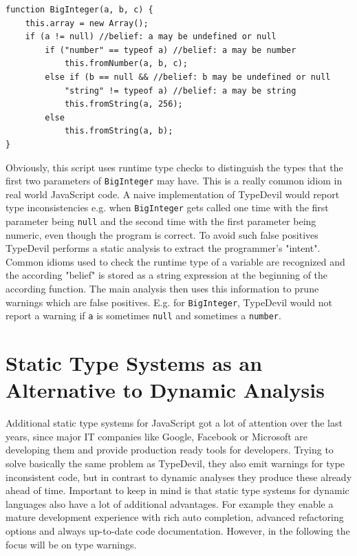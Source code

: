 \documentclass[runningheads,a4paper]{llncs}
\begin{document}
\medskip\medskip
\lstset{language=javascript}
\begin{minipage}{\linewidth}
\begin{lstlisting}[frame=single, caption=Pruning via Belief Analysis, label={lst:BeliefAnalysis}]
function BigInteger(a, b, c) { 
    this.array = new Array();
    if (a != null) //belief: a may be undefined or null
        if ("number" == typeof a) //belief: a may be number
            this.fromNumber(a, b, c);
        else if (b == null && //belief: b may be undefined or null
            "string" != typeof a) //belief: a may be string
            this.fromString(a, 256); 
        else  
            this.fromString(a, b);
}
\end{lstlisting}
\end{minipage}
Obviously, this script uses runtime type checks to distinguish the types that the first two parameters of \lstinline[columns=fixed]{BigInteger} may have.
This is a really common idiom in real world JavaScript code.
A naive implementation of TypeDevil would report type inconsistencies e.g. when \lstinline[columns=fixed]{BigInteger} gets called one time with the first parameter being \lstinline[columns=fixed]{null} and the second time with the first parameter being numeric, even though the program is correct. 
To avoid such false positives TypeDevil performs a static analysis to extract the programmer’s "intent".
Common idioms used to check the runtime type of a variable are recognized and the according "belief" is stored as a string expression at the beginning of the according function.
The main analysis then uses this information to prune warnings which are false positives.
E.g. for \lstinline[columns=fixed]{BigInteger}, TypeDevil would not report a warning if \lstinline[columns=fixed]{a} is sometimes \lstinline[columns=fixed]{null} and sometimes a \lstinline[columns=fixed]{number}.

\section{Static Type Systems as an Alternative to Dynamic Analysis}

Additional static type systems for JavaScript got a lot of attention over the last years, since major IT companies like Google, Facebook or Microsoft are developing them and provide production ready tools for developers.
Trying to solve basically the same problem as TypeDevil, they also emit warnings for type inconsistent code, but in contrast to dynamic analyses they produce these already ahead of time.
Important to keep in mind is that static type systems for dynamic languages also have a lot of additional advantages.
For example they enable a mature development experience with rich auto completion, advanced refactoring options and always up-to-date code documentation.
However, in the following the focus will be on type warnings.
\end{document}
